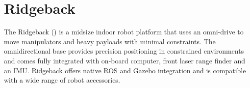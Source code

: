 \documentclass[times, utf8, diplomski, english]{fer}
\begin{document}
\section{Ridgeback} 
The Ridgeback () is a midsize indoor robot platform that uses an omni-drive to move manipulators and heavy payloads with minimal constraints. 
The omnidirectional base provides precision positioning in constrained environments and comes fully integrated with on-board computer, front laser range finder and an IMU. 
Ridgeback offers native ROS and Gazebo integration and is compatible with a wide range of robot accessories.
\end{document}
